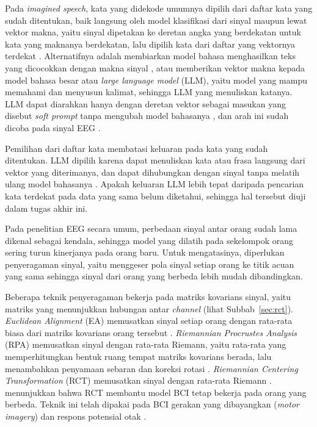 Pada \textit{imagined speech}, kata yang didekode umumnya dipilih dari daftar kata yang sudah ditentukan, baik langsung oleh model klasifikasi dari sinyal \parencite{lopezbernal2022} maupun lewat vektor makna, yaitu sinyal dipetakan ke deretan angka yang berdekatan untuk kata yang maknanya berdekatan, lalu dipilih kata dari daftar yang vektornya terdekat \parencite[lihat Subbab~\ref{sec:vektor-makna}]{pereira2018}.
Alternatifnya adalah membiarkan model bahasa menghasilkan teks yang dicocokkan dengan makna sinyal \parencite{tang2023}, atau memberikan vektor makna kepada model bahasa besar atau \textit{large language model} (LLM), yaitu model yang mampu memahami dan menyusun kalimat, sehingga LLM yang menuliskan katanya.
LLM dapat diarahkan hanya dengan deretan vektor sebagai masukan yang disebut \textit{soft prompt} tanpa mengubah model bahasanya \parencite[lihat Subbab~\ref{sec:soft-prompt}]{lester2021}, dan arah ini sudah dicoba pada sinyal EEG \parencite{mishra2025}.

Pemilihan dari daftar kata membatasi keluaran pada kata yang sudah ditentukan.
LLM dipilih karena dapat menuliskan kata atau frasa langsung dari vektor yang diterimanya, dan dapat dihubungkan dengan sinyal tanpa melatih ulang model bahasanya \parencite{lester2021}.
Apakah keluaran LLM lebih tepat daripada pencarian kata terdekat pada data yang sama belum diketahui, sehingga hal tersebut diuji dalam tugas akhir ini.

Pada penelitian EEG secara umum, perbedaan sinyal antar orang sudah lama dikenal sebagai kendala, sehingga model yang dilatih pada sekelompok orang sering turun kinerjanya pada orang baru.
Untuk mengatasinya, diperlukan penyeragaman sinyal, yaitu menggeser pola sinyal setiap orang ke titik acuan yang sama sehingga sinyal dari orang yang berbeda lebih mudah dibandingkan.

Beberapa teknik penyeragaman bekerja pada matriks kovarians sinyal, yaitu matriks yang menunjukkan hubungan antar \textit{channel} (lihat Subbab~\ref{sec:rct}).
\textit{Euclidean Alignment} (EA) memusatkan sinyal setiap orang dengan rata-rata biasa dari matriks kovarians orang tersebut \parencite{he2020}.
\textit{Riemannian Procrustes Analysis} (RPA) memusatkan sinyal dengan rata-rata Riemann, yaitu rata-rata yang memperhitungkan bentuk ruang tempat matriks kovarians berada, lalu menambahkan penyamaan sebaran dan koreksi rotasi \parencite{rodrigues2019}.
\textit{Riemannian Centering Transformation} (RCT) memusatkan sinyal dengan rata-rata Riemann \parencite{zanini2018}.
\textcite{zanini2018} menunjukkan bahwa RCT membantu model BCI tetap bekerja pada orang yang berbeda.
Teknik ini telah dipakai pada BCI gerakan yang dibayangkan (\textit{motor imagery}) dan respons potensial otak \parencite{bleuze2022,zanini2018}.

